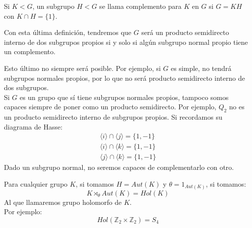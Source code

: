 \begin{definicion}
    Si $K<G$, un subgrupo $H<G$ se llama complemento para $K$ en $G$ si $G = KH$ con $K\cap H = \{1\}$.
\end{definicion}

\begin{observacion}
    Con esta última definición, tendremos que $G$ será un producto semidirecto interno de dos subgrupos propios si y solo si algún subgrupo normal propio tiene un complemento.
\end{observacion}

\begin{ejemplo}
    Esto último no siempre será posible. Por ejemplo, si $G$ es simple, no tendrá subgrupos normales propios, por lo que no será producto semidirecto interno de dos subgrupos.\\

    \noindent
    Si $G$ es un grupo que sí tiene subgrupos normales propios, tampoco somos capaces siempre de poner como un producto semidirecto. Por ejemplo, $Q_2$ no es un producto semidirecto interno de subgrupos propios. Si recordamos su diagrama de Hasse: %
    \begin{gather*}
        \langle i \rangle \cap \langle j \rangle  = \{1, -1\} \\
        \langle i \rangle \cap \langle k \rangle  = \{1, -1\} \\
        \langle j \rangle \cap \langle k \rangle  = \{1, -1\} 
    \end{gather*}
    Dado un subgrupo normal, no seremos capaces de complementarlo con otro.
\end{ejemplo}

\begin{ejemplo}
    Para cualquier grupo $K$, si tomamos $H = Aut(K)$ y $\theta = 1_{Aut(K)}$, si tomamos:
    \begin{equation*}
        K\rtimes_\theta Aut(K) = Hol(K)
    \end{equation*}
    Al que llamaremos grupo holomorfo de $K$.\\

    \noindent
    Por ejemplo:
    \begin{equation*}
        Hol(\mathbb{Z}_2\times \mathbb{Z}_2) = S_4
    \end{equation*}
\end{ejemplo}
